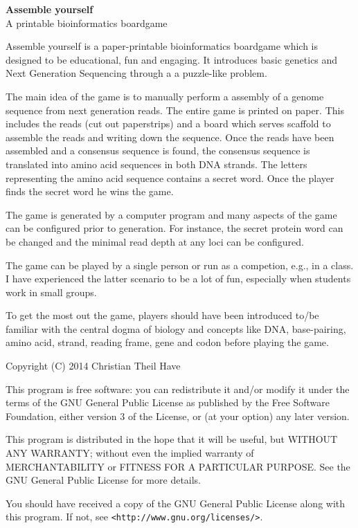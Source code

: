 \begin{titlepage}
\begin{center}

	{ \huge \bfseries Assemble yourself  \\[0.4cm] }
	A printable bioinformatics boardgame


\end{center}
{\large
Assemble yourself is a paper-printable bioinformatics boardgame which is designed to be educational, fun and engaging. 
It introduces basic genetics and Next Generation Sequencing through a a puzzle-like problem. 

The main idea of the game is to manually perform a assembly of a genome sequence
from next generation reads. The entire game is printed on paper. This includes the reads (cut out paperstrips) 
and a board which serves scaffold to assemble the reads and writing down the sequence.
Once the reads have been assembled and a consensus sequence is found, the consensus
sequence is translated into amino acid sequences in both DNA strands. The letters
representing the amino acid sequence contains a secret word. Once the player
finds the secret word he wins the game. 

The game is generated by a computer program and many aspects of the game can 
be configured prior to generation. For instance, the secret protein word
can be changed and the minimal read depth at any loci can be configured. 

The game can be played by a single person or run as a competion, e.g.,  in a class. I have experienced
the latter scenario to be a lot of fun, especially when students work in small groups. 

To get the most out the game, players should have been introduced to/be familiar with the central dogma of biology
and concepts like DNA, base-pairing, amino acid, strand, reading frame, gene and codon before playing the game.
}

\vfill 
{\small
Copyright (C) 2014 Christian Theil Have

This program is free software: you can redistribute it and/or modify
it under the terms of the GNU General Public License as published by
the Free Software Foundation, either version 3 of the License, or
(at your option) any later version.

This program is distributed in the hope that it will be useful,
but WITHOUT ANY WARRANTY; without even the implied warranty of
MERCHANTABILITY or FITNESS FOR A PARTICULAR PURPOSE.  See the
GNU General Public License for more details.

You should have received a copy of the GNU General Public License
along with this program.  If not, see \verb|<http://www.gnu.org/licenses/>|.
}

\end{titlepage}

